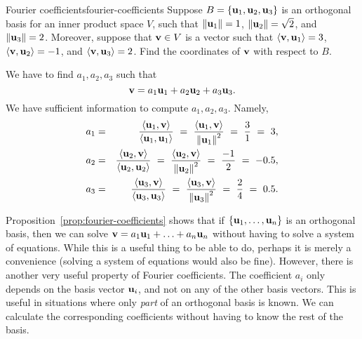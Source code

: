 \begin{example}{Fourier coefficients}{fourier-coefficients}
  Suppose $B=\set{\vect{u}_1,\vect{u}_2,\vect{u}_3}$ is an orthogonal
  basis for an inner product space $V$, such that
  $\norm{\vect{u}_1}=1$, $\norm{\vect{u}_2}=\sqrt{2}$, and
  $\norm{\vect{u}_3}=2$.  Moreover, suppose that $\vect{v}\in V$ is a
  vector such that $\iprod{\vect{v},\vect{u}_1} = 3$,
  $\iprod{\vect{v},\vect{u}_2} = -1$, and
  $\iprod{\vect{v},\vect{u}_3} = 2$.  Find the coordinates of
  $\vect{v}$ with respect to $B$.
\end{example}

\begin{solution}
  We have to find $a_1,a_2,a_3$ such that
  \begin{equation*}
    \vect{v} = a_1\vect{u}_1 + a_2\vect{u}_2 + a_3\vect{u}_3.
  \end{equation*}
  We have sufficient information to compute $a_1,a_2,a_3$. Namely,
  \begin{eqnarray*}
    a_1
    &=& \frac{\iprod{\vect{u}_1,\vect{v}}}{\iprod{\vect{u}_1,\vect{u}_1}}
        ~=~ \frac{\iprod{\vect{u}_1,\vect{v}}}{\norm{\vect{u}_1}^2}
        ~=~ \frac{3}{1} ~=~ 3, \\
    a_2
    &=& \frac{\iprod{\vect{u}_2,\vect{v}}}{\iprod{\vect{u}_2,\vect{u}_2}}
        ~=~ \frac{\iprod{\vect{u}_2,\vect{v}}}{\norm{\vect{u}_2}^2}
        ~=~ \frac{-1}{2} ~=~ -0.5, \\
    a_3
    &=& \frac{\iprod{\vect{u}_3,\vect{v}}}{\iprod{\vect{u}_3,\vect{u}_3}}
        ~=~ \frac{\iprod{\vect{u}_3,\vect{v}}}{\norm{\vect{u}_3}^2}
        ~=~ \frac{2}{4} ~=~ 0.5.
  \end{eqnarray*}
\end{solution}

Proposition~\ref{prop:fourier-coefficients} shows that if
$\set{\vect{u}_1,\ldots,\vect{u}_n}$ is an orthogonal basis, then we
can solve $\vect{v} = a_1\vect{u}_1 + \ldots + a_n\vect{u}_n$ without
having to solve a system of equations. While this is a useful thing to
be able to do, perhaps it is merely a convenience (solving a system of
equations would also be fine). However, there is another very useful
property of Fourier coefficients. The coefficient $a_i$ only depends
on the basis vector $\vect{u}_i$, and not on any of the other basis
vectors. This is useful in situations where only {\em part} of an
orthogonal basis is known. We can calculate the corresponding
coefficients without having to know the rest of the basis.

